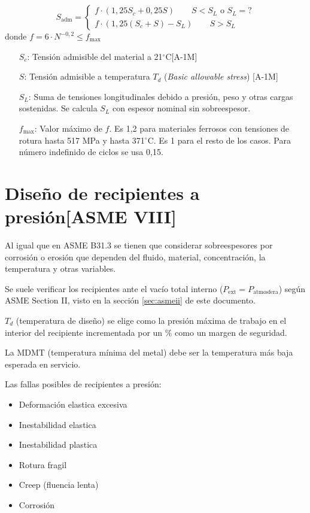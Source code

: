 \documentclass[twocolumn]{article}
\newcommand{\adm}{\text{adm}}
\newcommand{\Pext}{P_\text{ext}}
\newcommand{\grad}{\ensuremath{^\circ \textrm{C}}}
\begin{document}
\[
S_\adm = \begin{cases}
f \cdot (1,25 S_c + 0,25 S) \qquad S<S_L\text{ o $S_L=$?} \\
f \cdot  (1,25 (S_c+S) - S_L) \qquad S>S_L 
\end{cases}
\]
donde $f = 6\cdot N^{-0,2}\leq f_{\max}$
\begin{itemize}
	\item[$S_c$:] Tensión admisible del material a 21\grad [A-1M] 
	\item[$S$:] Tensión admisible a temperatura $T_d$ (\textit{Basic allowable stress}) [A-1M] 
	\item[$S_L$:] Suma de tensiones longitudinales debido a presión, peso y otras cargas sostenidas. Se calcula $S_L$ con espesor nominal sin sobreespesor. 
	\item[$f_{\max}$:] Valor máximo de $f$. Es 1,2 para materiales ferrosos con tensiones de rotura hasta 517 MPa y hasta 371\grad. Es 1 para el resto de los casos. Para número indefinido de ciclos se usa 0,15.
\end{itemize}



\section{Diseño de recipientes a presión[ASME VIII]}
Al igual que en ASME B31.3 se tienen que considerar sobreespesores por corrosión o erosión que dependen del fluido, material, concentración, la temperatura y otras variables.

Se suele verificar los recipientes ante el vacío total interno ($\Pext=P_\text{atmosfera}$) según ASME Section II, visto en la sección \ref{sec:asmeii} de este documento.

$T_d$ (temperatura de diseño) se elige como la presión máxima de trabajo en el interior del recipiente incrementada por un \% como un margen de seguridad.

La MDMT (temperatura mínima del metal) debe ser la temperatura más baja esperada en servicio.

Las fallas posibles de recipientes a presión:
\begin{itemize}
	\item Deformación elastica excesiva
	\item Inestabilidad elastica
	\item Inestabilidad plastica
	\item Rotura fragil
	\item Creep (fluencia lenta)
	\item Corrosión
\end{itemize}
\end{document}
